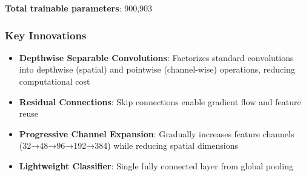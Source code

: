 \documentclass[12pt,a4paper]{article}
\begin{document}
\textbf{Total trainable parameters}: 900,903

\subsubsection{Key Innovations}
\begin{itemize}[leftmargin=*]
    \item \textbf{Depthwise Separable Convolutions}: Factorizes standard convolutions into depthwise (spatial) and pointwise (channel-wise) operations, reducing computational cost
    \item \textbf{Residual Connections}: Skip connections enable gradient flow and feature reuse
    \item \textbf{Progressive Channel Expansion}: Gradually increases feature channels (32→48→96→192→384) while reducing spatial dimensions
    \item \textbf{Lightweight Classifier}: Single fully connected layer from global pooling
\end{itemize}
\end{document}
